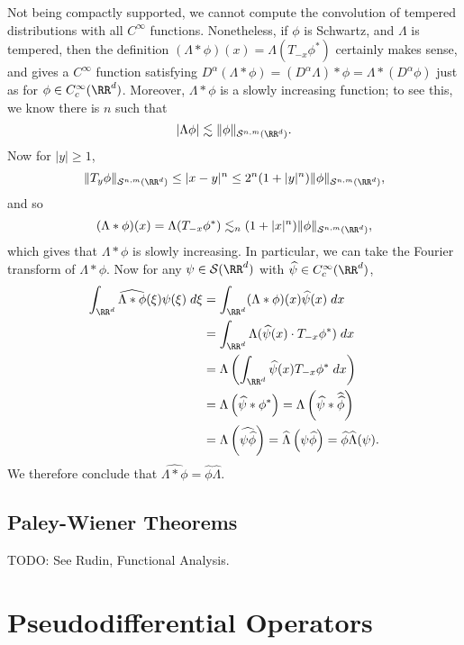 Not being compactly supported, we cannot compute the convolution of tempered distributions with all $C^\infty$ functions. Nonetheless, if $\phi$ is Schwartz, and $\Lambda$ is tempered, then the definition $(\Lambda * \phi)(x) = \Lambda(T_{-x} \phi^*)$ certainly makes sense, and gives a $C^\infty$ function satisfying $D^\alpha(\Lambda * \phi) = (D^\alpha \Lambda) * \phi = \Lambda * (D^\alpha \phi)$ just as for $\phi \in C_c^\infty(\RR^d)$. Moreover, $\Lambda * \phi$ is a slowly increasing function; to see this, we know there is $n$ such that
%
\[ |\Lambda \phi| \lesssim \| \phi \|_{\mathcal{S}^{n,m}(\RR^d)}. \]
%
Now for $|y| \geq 1$,
%
\[ \| T_y \phi \|_{\mathcal{S}^{n,m}(\RR^d)} \leq |x-y|^n \leq 2^n (1 + |y|^n) \| \phi \|_{\mathcal{S}^{n,m}(\RR^d)}, \]
%
and so
%
\[ (\Lambda * \phi)(x) = \Lambda(T_{-x} \phi^*) \lesssim_n (1 + |x|^n) \| \phi \|_{\mathcal{S}^{n,m}(\RR^d)}, \]
%
which gives that $\Lambda * \phi$ is slowly increasing. In particular, we can take the Fourier transform of $\Lambda * \phi$. Now for any $\psi \in \mathcal{S}(\RR^d)$ with $\widehat{\psi} \in C_c^\infty(\RR^d)$,
%
\begin{align*}
  \int_{\RR^d} \widehat{\Lambda * \phi}(\xi) \psi(\xi)\; d\xi &= \int_{\RR^d} (\Lambda * \phi)(x) \widehat{\psi}(x)\; dx\\
  &= \int_{\RR^d} \Lambda( \widehat{\psi}(x) \cdot T_{-x} \phi^*)\; dx\\
  &= \Lambda \left( \int_{\RR^d} \widehat{\psi}(x) T_{-x} \phi^*\; dx \right)\\
  &= \Lambda \left( \widehat{\psi} * \phi^* \right) = \Lambda \left( \widehat{\psi} * \widehat{\widehat{\phi}} \right)\\
  &= \Lambda \left( \widehat{\psi \widehat{\phi}} \right) = \widehat{\Lambda} \left( \psi \widehat{\phi} \right) = \widehat{\phi} \widehat{\Lambda}(\psi).
\end{align*}
%
We therefore conclude that $\widehat{\Lambda * \phi} = \widehat{\phi} \widehat{\Lambda}$.

\section{Paley-Wiener Theorems}

TODO: See Rudin, Functional Analysis.








\chapter{Pseudodifferential Operators}

